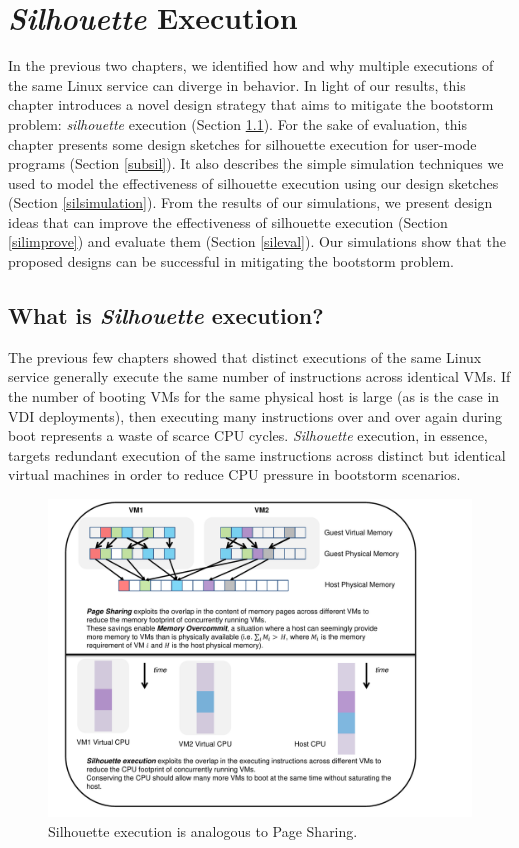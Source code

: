 \chapter{{\em Silhouette} Execution}
In the previous two chapters,
we identified how and why
multiple executions of the same
Linux service can diverge in behavior.
In light of our results, this chapter introduces a 
novel design strategy that aims to mitigate the bootstorm problem:
{\em silhouette} execution (Section \ref{def:sil}).
For the sake of evaluation, this chapter
presents some design sketches for silhouette
execution for user-mode programs (Section \ref{subsil}).
It also describes the simple simulation techniques we used 
to model the effectiveness of silhouette
execution using our design sketches
(Section \ref{silsimulation}).
From the results of our simulations, we present design ideas
that can improve the effectiveness of
silhouette execution (Section \ref{silimprove})
and evaluate them (Section \ref{sileval}).
Our simulations show that the proposed designs can be successful
in mitigating the bootstorm problem. 

\section{What is {\em Silhouette} execution?} \label{def:sil}
The previous few chapters showed that
distinct executions of the same Linux service
generally execute the same number of instructions
across identical VMs. If the number of booting VMs for
the same physical host is large (as is 
the case in VDI deployments),
then executing many instructions over
and over again during boot represents a waste of scarce CPU cycles.
{\em Silhouette} execution, in essence, targets
redundant execution of the same instructions across distinct but
identical virtual machines in order to reduce CPU pressure in bootstorm
scenarios. 
\newpage

\begin{figure} []
  \centering
  \includegraphics[scale=0.8, trim=2cm 0cm -5cm 0cm]{overcommit.pdf}
  \caption[Silhouette execution is analogous to Page Sharing.]%
          {Silhouette execution is analogous to Page Sharing.}

  \label{silconcept}
\end{figure}

